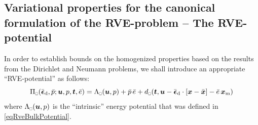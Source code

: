 \documentclass{bmcart}
\newcommand{\eqtref}[1]{\eqref{#1}}
\renewcommand{\dev}{\mathrm{d}}
\newcommand{\rve}{
  {\mathchoice
   {\mbox{\scalebox{0.67}{$\Box$}}}
   {\mbox{\scalebox{0.67}{$\Box$}}}
   {\mbox{\scalebox{0.5}{$\Box$}}}
   {\mbox{\scalebox{0.375}{$\Box$}}}
  }
}
\begin{document}
\subsection{Variational properties for the canonical formulation of the RVE-problem -- The RVE-potential}

In order to establish bounds on the homogenized properties based on the results from the Dirichlet and Neumann problems, we shall introduce an appropriate ``RVE-potential'' as follows:
\begin{equation}
    \Pi_\rve(\bar{\ts\epsilon}_\dev,\bar{p};\ta{u},p,\ta{t},\bar{e}) =
    \Lambda_\rve(\ta{u},p) + \bar{p}\,\bar{e} +
    d_\rve(\ta{t},\ta{u}-\bar{\ts\epsilon}_\dev\cdot[\ta{x}-\bar{\ta{x}}]-\bar{e}\,\ta{x}_\mean)
\label{eq81}
\end{equation}
where $\Lambda_\rve(\ta{u},p)$ is the ``intrinsic'' energy potential that was defined in \eqtref{eqRveBulkPotential}.
\end{document}
